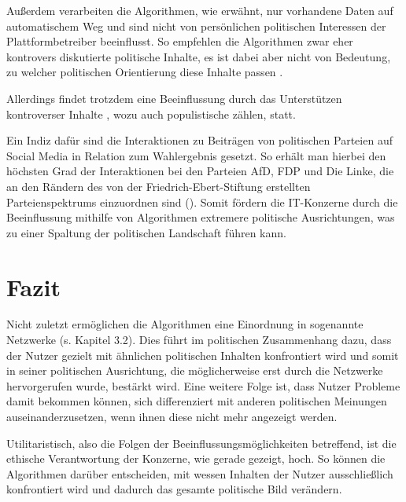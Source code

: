 Außerdem verarbeiten die Algorithmen, wie erwähnt, nur vorhandene Daten auf automatischem Weg und sind nicht von persönlichen politischen Interessen der Plattformbetreiber beeinflusst. So empfehlen die Algorithmen zwar eher kontrovers diskutierte politische Inhalte, es ist dabei aber nicht von Bedeutung, zu welcher politischen Orientierung diese Inhalte passen \autocite[vgl.][198,199]{wylie2019mindf}.

Allerdings findet trotzdem eine Beeinflussung durch das Unterstützen kontroverser Inhalte \autocite[vgl.][198,199]{wylie2019mindf}, wozu auch populistische zählen, statt. 

Ein Indiz dafür sind die Interaktionen zu Beiträgen von politischen Parteien \autocite[vgl.][]{InteraktionenSM} auf Social Media in Relation zum Wahlergebnis \autocite[vgl.][]{Wahl2017Ergebnis} gesetzt. So erhält man hierbei den höchsten Grad der Interaktionen bei den Parteien AfD, FDP und Die Linke, die an den Rändern des von der Friedrich-Ebert-Stiftung erstellten Parteienspektrums einzuordnen sind \autocite[vgl.][]{ParteienspektrumD} (\autocite[]{tab:InteraktionenWahl2017}). Somit fördern die IT-Konzerne durch die Beeinflussung mithilfe von Algorithmen extremere politische Ausrichtungen, was zu einer Spaltung der politischen Landschaft führen kann. 
\section{Fazit}
Nicht zuletzt ermöglichen die Algorithmen eine Einordnung in sogenannte Netzwerke (s. Kapitel 3.2). Dies führt im politischen Zusammenhang dazu, dass der Nutzer gezielt mit ähnlichen politischen Inhalten konfrontiert wird und somit in seiner politischen Ausrichtung, die möglicherweise erst durch die Netzwerke hervorgerufen wurde, bestärkt wird. Eine weitere Folge ist, dass Nutzer Probleme damit bekommen können, sich differenziert mit anderen politischen Meinungen auseinanderzusetzen, wenn ihnen diese nicht mehr angezeigt werden. 

Utilitaristisch, also die Folgen der Beeinflussungsmöglichkeiten betreffend, ist die ethische Verantwortung der Konzerne, wie gerade gezeigt, hoch. So können die Algorithmen darüber entscheiden, mit wessen Inhalten der Nutzer ausschließlich konfrontiert wird und dadurch das gesamte politische Bild verändern. 



